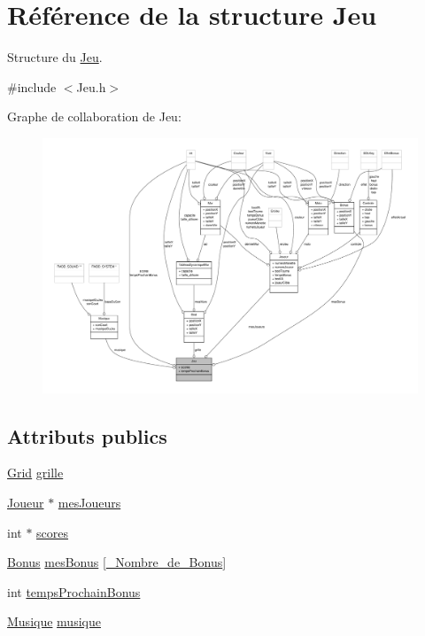 \hypertarget{structJeu}{\section{Référence de la structure Jeu}
\label{structJeu}
}


Structure du \hyperlink{structJeu}{Jeu}.  




{\ttfamily \#include $<$Jeu.\-h$>$}



Graphe de collaboration de Jeu\-:
\nopagebreak
\begin{figure}[H]
\begin{center}
\leavevmode
\includegraphics[width=350pt]{structJeu__coll__graph}
\end{center}
\end{figure}
\subsection*{Attributs publics}
\begin{DoxyCompactItemize}
\item 
\hyperlink{structGrid}{Grid} \hyperlink{structJeu_a004d8d0f888b9dea26cbbc2d6afea6e7}{grille}
\item 
\hyperlink{structJoueur}{Joueur} $\ast$ \hyperlink{structJeu_aafbe63ae87dd9d9b17e69ae94123ee31}{mes\-Joueurs}
\item 
int $\ast$ \hyperlink{structJeu_a3db4303dcbb7630f11d5bfdf4a7bf181}{scores}
\item 
\hyperlink{structBonus}{Bonus} \hyperlink{structJeu_a70bf0e19753aaa6cfba719388aae410d}{mes\-Bonus} \mbox{[}\hyperlink{Constantes_8h_af4e31715ab308023d6200e64b86b9946}{\-\_\-\-Nombre\-\_\-de\-\_\-\-Bonus}\mbox{]}
\item 
int \hyperlink{structJeu_a08a8620c89aa61ed6bbeb2dcf6c68a40}{temps\-Prochain\-Bonus}
\item 
\hyperlink{structMusique}{Musique} \hyperlink{structJeu_a254bcdad7f9995cb345b777980ffdbe0}{musique}
\end{DoxyCompactItemize}



